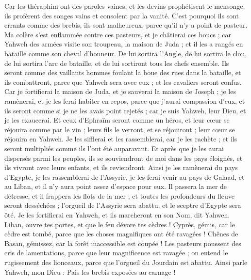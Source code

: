 \begin{multicols}{2}
Car les théraphim ont des paroles vaines, et les devins prophétisent le mensonge, ils profèrent des songes vains et consolent par la vanité. C'est pourquoi ils sont errants comme des brebis, ils sont malheureux, parce qu'il n'y a point de pasteur.
Ma colère s'est enflammée contre ces pasteurs, et je châtierai ces boucs ; car Yahweh des armées visite son troupeau, la maison de Juda ; et il les a rangés en bataille comme son cheval d'honneur.
De lui sortira l'Angle, de lui sortira le clou, de lui sortira l'arc de bataille, et de lui sortiront tous les chefs ensemble.
Ils seront comme des vaillants hommes foulant la boue des rues dans la bataille, et ils combattront, parce que Yahweh sera avec eux ; et les cavaliers seront confus.
Car je fortifierai la maison de Juda, et je sauverai la maison de Joseph ; je les ramènerai, et je les ferai habiter en repos, parce que j'aurai compassion d'eux, et ils seront comme si je ne les avais point rejetés ; car je suis Yahweh, leur Dieu, et je les exaucerai.
Et ceux d'Ephraïm seront comme un héros, et leur cœur se réjouira comme par le vin ; leurs fils le verront, et se réjouiront ; leur cœur se réjouira en Yahweh.
Je les sifflerai et les rassemblerai, car je les rachète ; et ils seront multipliés comme ils l'ont été auparavant.
Et après que je les aurai dispersés parmi les peuples, ils se souviendront de moi dans les pays éloignés, et ils vivront avec leurs enfants, et ils reviendront.
Ainsi je les ramènerai du pays d'Egypte, je les rassemblerai de l'Assyrie, je les ferai venir au pays de Galaad, et au Liban, et il n'y aura point assez d'espace pour eux.
Il passera la mer de détresse, et il frappera les flots de la mer ; et toutes les profondeurs du fleuve seront desséchées ; l'orgueil de l'Assyrie sera abattu, et le sceptre d'Egypte sera ôté.
Je les fortifierai en Yahweh, et ils marcheront en son Nom, dit Yahweh.
\VerseOne{}Liban, ouvre tes portes, et que le feu dévore tes cèdres !
Cyprès, gémis, car le cèdre est tombé, parce que les choses magnifiques ont été ravagées ! Chênes de Basan, gémissez, car la forêt inaccessible est coupée !
Les pasteurs poussent des cris de lamentations, parce que leur magnificence est ravagée ; on entend le rugissement des lionceaux, parce que l'orgueil du Jourdain est abattu.
Ainsi parle Yahweh, mon Dieu : Pais les brebis exposées au carnage !

\end{multicols}
